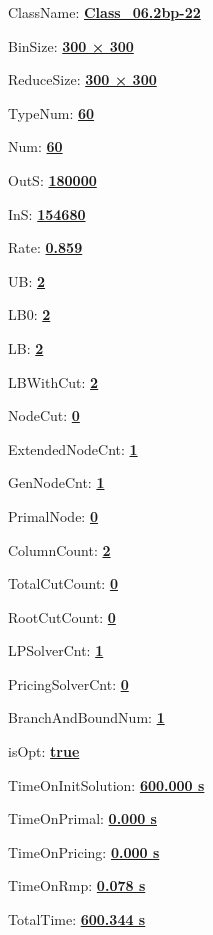 \documentclass[11pt]{article}
\begin{document}
\pagestyle{empty}


ClassName: \underline{\textbf{Class_06.2bp-22}}
\par
BinSize: \underline{\textbf{300 × 300}}
\par
ReduceSize: \underline{\textbf{300 × 300}}
\par
TypeNum: \underline{\textbf{60}}
\par
Num: \underline{\textbf{60}}
\par
OutS: \underline{\textbf{180000}}
\par
InS: \underline{\textbf{154680}}
\par
Rate: \underline{\textbf{0.859}}
\par
UB: \underline{\textbf{2}}
\par
LB0: \underline{\textbf{2}}
\par
LB: \underline{\textbf{2}}
\par
LBWithCut: \underline{\textbf{2}}
\par
NodeCut: \underline{\textbf{0}}
\par
ExtendedNodeCnt: \underline{\textbf{1}}
\par
GenNodeCnt: \underline{\textbf{1}}
\par
PrimalNode: \underline{\textbf{0}}
\par
ColumnCount: \underline{\textbf{2}}
\par
TotalCutCount: \underline{\textbf{0}}
\par
RootCutCount: \underline{\textbf{0}}
\par
LPSolverCnt: \underline{\textbf{1}}
\par
PricingSolverCnt: \underline{\textbf{0}}
\par
BranchAndBoundNum: \underline{\textbf{1}}
\par
isOpt: \underline{\textbf{true}}
\par
TimeOnInitSolution: \underline{\textbf{600.000 s}}
\par
TimeOnPrimal: \underline{\textbf{0.000 s}}
\par
TimeOnPricing: \underline{\textbf{0.000 s}}
\par
TimeOnRmp: \underline{\textbf{0.078 s}}
\par
TotalTime: \underline{\textbf{600.344 s}}
\par
\newpage
\end{document}
